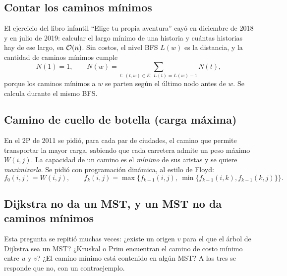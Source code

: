 \subsection{Contar los caminos mínimos}

El ejercicio del libro infantil ``Elige tu propia aventura'' cayó en diciembre de 2018 y en julio de 2019: calcular el largo mínimo de una historia y cuántas historias hay de ese largo, en $\mathcal{O}(n)$. Sin costos, el nivel BFS $L(w)$ es la distancia, y la cantidad de caminos mínimos cumple
\[ N(1)=1,\qquad N(w)=\sum_{t:\,(t,w)\in E,\ L(t)=L(w)-1} N(t), \]
porque los caminos mínimos a $w$ se parten según el último nodo antes de $w$. Se calcula durante el mismo BFS.

\subsection{Camino de cuello de botella (carga máxima)}

En el 2P de 2011 se pidió, para cada par de ciudades, el camino que permite transportar la mayor carga, sabiendo que cada carretera admite un peso máximo $W(i,j)$. La capacidad de un camino es el \emph{mínimo} de sus aristas y se quiere \emph{maximizarla}. Se pidió con programación dinámica, al estilo de Floyd:
\[ f_0(i,j)=W(i,j),\qquad f_k(i,j)=\max\bigl\{f_{k-1}(i,j),\ \min\{f_{k-1}(i,k),f_{k-1}(k,j)\}\bigr\}. \]

\subsection{Dijkstra no da un MST, y un MST no da caminos mínimos}

Esta pregunta se repitió muchas veces: ¿existe un origen $v$ para el que el árbol de Dijkstra sea un MST? ¿Kruskal o Prim encuentran el camino de costo mínimo entre $u$ y $v$? ¿El camino mínimo está contenido en algún MST? A las tres se responde que no, con un contraejemplo.

